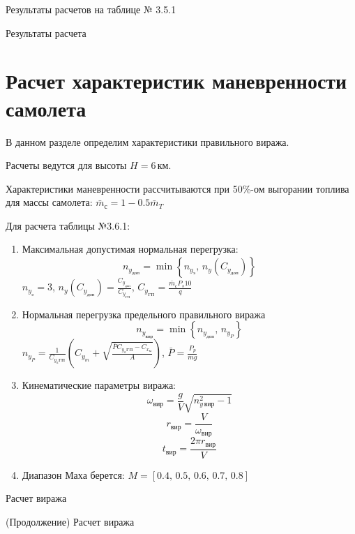 Результаты расчетов на таблице № 3.5.1

\begin{table}[H]
    \centering
    \caption{Результаты расчета}
    \label{tab:landing_takeoff}
    
\end{table}

\section{Расчет характеристик маневренности самолета}

В данном разделе определим характеристики правильного виража.

Расчеты ведутся для высоты $H=6\, \text{км}$.

Характеристики маневренности рассчитываются при 50\%-ом выгорании
топлива для массы самолета: $\bar{m}_с = 1 - 0.5 \bar{m}_T$

Для расчета таблицы №3.6.1:
\begin{enumerate}
    \item Максимальная допустимая нормальная перегрузка:
        \[
            n_{y_{доп}}=\min \left\{ n_{y_{э}},\,n_y(C_{y_{доп}}) \right\} 
        \]
        $n_{y_{э}} = 3$, $n_y(C_{y_{доп}}) = \frac{C_{y_{доп}}}{C_{y_{ГП}}}$,
        $C_{y_{ГП}} = \frac{\bar{m}_с P_s 10}{q}$
    \item Нормальная перегрузка предельного правильного виража
        \[
            n_{y_{вир}}=\min \left\{ n_{y_{доп}},\,n_{y_P} \right\} 
        \]
        $n_{y_{P}} = \frac{1}{C_{y_{a}ГП}} \left( C_{y_m} + \sqrt{
        \frac{\bar{P} C_{y_{a}ГП} - C_{x_{м}} }{A}} \right) $, $\bar{P} = \frac{P_p}{mg}$
    \item Кинематические параметры виража:
        \[
            \omega_{вир}  = \frac{g}{V} \sqrt{n_{y\, вир}^2 - 1}
        \]
        \[
            r_{вир} = \frac{V}{\omega_{вир}}
        \]
        \[
            t_{вир} = \frac{2 \pi r_{вир}}{V}
        \]
        \item Диапазон Маха берется:
            $M = [0.4,\, 0.5,\, 0.6,\,0.7,\,0.8]$
\end{enumerate}

\begin{table}[H]
    \centering
    \caption{Расчет виража}
    \label{tab:turn_part1}
    
\end{table}
\begin{table}[H]
    \centering
    \caption{(Продолжение) Расчет виража}
    \label{tab:turn_part2}
    
\end{table}
 

